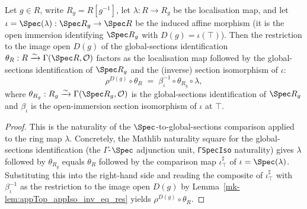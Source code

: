 \begin{lemma}\label{mk-lem:key_morph}
  \leanok

  Let \(g \in R\), write \(R_g = R[g^{-1}]\), let \(\lambda : R \to R_g\) be the localisation map, and let
  \(\iota = \Spec(\lambda) : \Spec R_g \to \Spec R\) be the induced affine morphism (it is the open
  immersion identifying \(\Spec R_g\) with \(D(g) = \iota(\top)\)). Then the restriction to the image
  open \(D(g)\) of the global-sections identification
  \(\theta_R : R \xrightarrow{\sim} \Gamma(\Spec R, \mathcal{O})\) factors as the localisation map
  followed by the global-sections identification of \(\Spec R_g\) and the (inverse) section isomorphism
  of \(\iota\):
  \[
    \rho^{D(g)} \circ \theta_R
    \;=\;
    \beta_\iota^{-1} \circ \theta_{R_g} \circ \lambda,
  \]
  where \(\theta_{R_g} : R_g \xrightarrow{\sim} \Gamma(\Spec R_g, \mathcal{O})\) is the global-sections
  identification of \(\Spec R_g\) and \(\beta_\iota\) is the open-immersion section isomorphism of
  \(\iota\) at \(\top\).
\end{lemma}
\begin{proof}
  \leanok
  This is the naturality of the \(\Spec\)-to-global-sections comparison applied to the ring map
  \(\lambda\). Concretely, the Mathlib naturality square for the global-sections identification (the
  \(\Gamma\)-\(\Spec\) adjunction unit, \texttt{ΓSpecIso} naturality) gives
  \(\lambda \) followed by \(\theta_{R_g}\) equals \(\theta_R\) followed by the comparison map
  \(\iota^{\sharp}_{\top}\) of \(\iota = \Spec(\lambda)\). Substituting this into the right-hand side and
  reading the composite of \(\iota^{\sharp}_{\top}\) with \(\beta_\iota^{-1}\) as the restriction to the
  image open \(D(g)\) by Lemma~\ref{mk-lem:appTop_appIso_inv_eq_res} yields \(\rho^{D(g)} \circ \theta_R\).
\end{proof}

